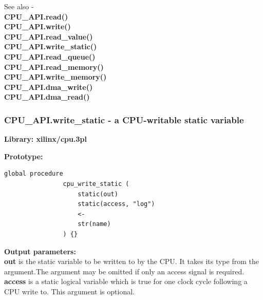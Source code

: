             See also - \\
            {\bf CPU\_API.read()}  \\
            {\bf CPU\_API.write()}  \\
            {\bf CPU\_API.read\_value()}  \\
            {\bf CPU\_API.write\_static()}  \\
            {\bf CPU\_API.read\_queue()}  \\
            {\bf CPU\_API.read\_memory()}  \\
            {\bf CPU\_API.write\_memory()}  \\
            {\bf CPU\_API.dma\_write()}  \\
            {\bf CPU\_API.dma\_read()}  \\


            

            
                
        \subsubsection{CPU\_API.write\_static - a CPU-writable static
                                            variable}\label{sec:lpcpuwrstat}

            {\bf Library: xilinx/cpu.3pl}

            {\bf Prototype:} \\
            \vsp
            \begin{lstlisting}[gobble=12, language=threepl]
                global procedure
                cpu_write_static (
                    static(out)
                    static(access, "log")
                    <-
                    str(name)
                ) {}
            \end{lstlisting}

            {\bf Output parameters:} \\
            {\bf out} is the static variable to be written to by the CPU. It
            takes its type from the argument.The argument may be omitted if only
            an access signal is required.\\
            {\bf access} is a static logical variable which is true for one clock
            cycle following a CPU write to. This argument is optional.\\

